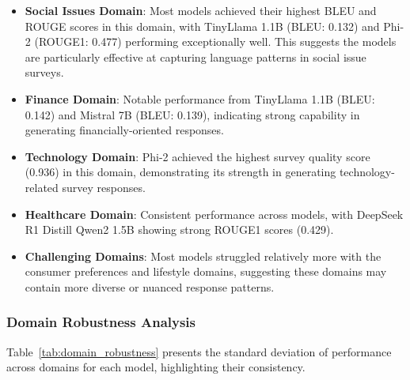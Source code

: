 \documentclass[11pt]{article}
\begin{document}
\begin{itemize}
\item \textbf{Social Issues Domain}: Most models achieved their highest BLEU and ROUGE scores in this domain, with TinyLlama 1.1B (BLEU: 0.132) and Phi-2 (ROUGE1: 0.477) performing exceptionally well. This suggests the models are particularly effective at capturing language patterns in social issue surveys.

\item \textbf{Finance Domain}: Notable performance from TinyLlama 1.1B (BLEU: 0.142) and Mistral 7B (BLEU: 0.139), indicating strong capability in generating financially-oriented responses.

\item \textbf{Technology Domain}: Phi-2 achieved the highest survey quality score (0.936) in this domain, demonstrating its strength in generating technology-related survey responses.

\item \textbf{Healthcare Domain}: Consistent performance across models, with DeepSeek R1 Distill Qwen2 1.5B showing strong ROUGE1 scores (0.429).

\item \textbf{Challenging Domains}: Most models struggled relatively more with the consumer preferences and lifestyle domains, suggesting these domains may contain more diverse or nuanced response patterns.
\end{itemize}

\subsubsection{Domain Robustness Analysis}

Table~\ref{tab:domain_robustness} presents the standard deviation of performance across domains for each model, highlighting their consistency.

\begin{table}[t]
\centering
{}
\caption{Standard deviation of performance across domains. SQ = Survey Quality, SS = Sentiment Similarity. Lower values indicate more consistent performance.}
\label{tab:domain_robustness}
\end{table}
\end{document}
